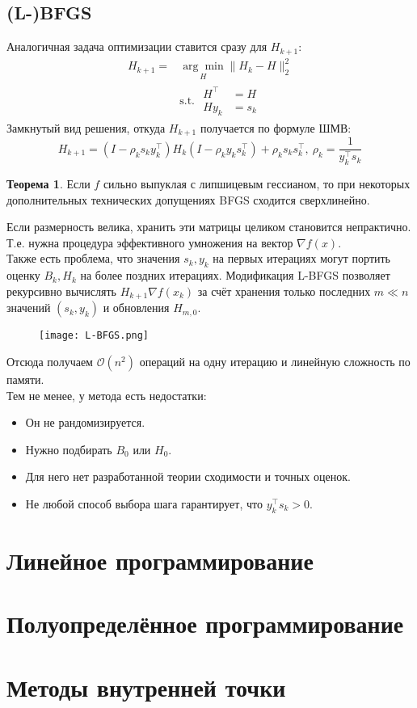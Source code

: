 \documentclass[11pt,a4paper]{report}
\theoremstyle{definition}
\theoremstyle{definition}
\newtheorem{theorem}{Теорема}[section]
\theoremstyle{definition}
\begin{document}
	\subsection{(L-)BFGS}
	Аналогичная задача оптимизации ставится сразу для $H_{k+1}$:
	\begin{align*}
		H_{k+1} = &\underset{H}{\arg\min} \| H_k - H \|_2^2\\
		&\text{s.t. } 
		\begin{aligned} 
		H^{\top} &= H\\ 
		H y_k &= s_k
		\end{aligned}
	\end{align*}
	Замкнутый вид решения, откуда $ H_{k+1} $ получается по формуле ШМВ:
	$$
		H_{k+1} = (I - \rho_k s_k y_k^\top) H_k (I - \rho_k y_k s_k^{\top}) + \rho_k s_k s_k^{\top},\ \rho_k = \frac{1}{y_k^\top s_k}
	$$
	\begin{theorem}
		Если $ f $ сильно выпуклая с липшицевым гессианом, то при некоторых дополнительных технических допущениях BFGS сходится сверхлинейно.
	\end{theorem}
	\noindent Если размерность велика, хранить эти матрицы целиком становится непрактично.\\
	Т.е. нужна процедура эффективного умножения на вектор $ \nabla f(x) $.\\
	Также есть проблема, что значения $ s_k, y_k $ на первых итерациях могут портить оценку $ B_k, H_k $ на более поздних итерациях.	Модификация L-BFGS позволяет рекурсивно вычислять $ H_{k+1} \nabla f(x_k) $ за счёт хранения только последних $ m \ll n $ значений $ (s_k, y_k) $ и обновления $ H_{m,0} $. 
	\begin{figure}[H]
		\texttt{[image: L-BFGS.png]}
	\end{figure}
	\noindent Отсюда получаем $ \mathcal{O}(n^2) $ операций на одну итерацию и линейную сложность по памяти.\\
	Тем не менее, у метода есть недостатки:
	\begin{itemize}[$\diamond$]
		\item Он не рандомизируется.
		\item Нужно подбирать $ B_0 $ или $ H_0 $.
		\item Для него нет разработанной теории сходимости и точных оценок.
		\item Не любой способ выбора шага гарантирует, что $ y_k^\top s_k > 0 $.
	\end{itemize}
	\section{Линейное программирование}
	\section{Полуопределённое программирование}
	\section{Методы внутренней точки}
\end{document}
